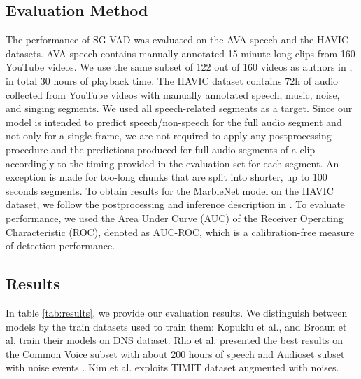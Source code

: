 \documentclass{article}
\begin{document}
\subsection{Evaluation Method}
\label{sec:evaluation}

The performance of SG-VAD was evaluated on the AVA speech \cite{chaudhuri2018ava} and the HAVIC \cite{strassel2012creating} datasets. AVA speech
contains manually annotated 15-minute-long clips from 160 YouTube videos. We use the same subset of 122 out of 160 videos as authors in \cite{jia2021marblenet}, in total 30 hours of playback time. The HAVIC dataset contains
72h of audio collected from YouTube videos with manually annotated speech, music, noise, and singing segments. We used all speech-related segments as a target. Since our model is intended to predict speech/non-speech for the full audio segment and not only for a single frame, we are not required to apply any postprocessing procedure and the predictions produced for full audio segments of a clip accordingly to the timing provided in the evaluation set for each segment. An exception is made for too-long chunks that are split into shorter, up to 100 seconds segments.
To obtain results for the MarbleNet model on the HAVIC dataset, we follow the postprocessing and inference description in \cite{jia2021marblenet}. To evaluate performance,
we used the Area Under Curve (AUC) of the Receiver Operating Characteristic (ROC), denoted as AUC-ROC, which is a calibration-free measure of detection performance. 

\subsection{Results}
\label{sec:results}

In table \ref{tab:results}, we provide our evaluation results. 
We distinguish between models by the train datasets used to train them: Kopuklu et al., and Broaun et al. train their models on DNS \cite{reddy2020interspeech} dataset. Rho et al. presented the best results on the Common Voice \cite{ardila2019common} subset with about 200 hours of speech and Audioset subset with noise events \cite{reddy2021interspeech, gemmeke2017audio}. Kim et al. exploits TIMIT dataset \cite{zue1990speech} augmented with noises.
\end{document}
